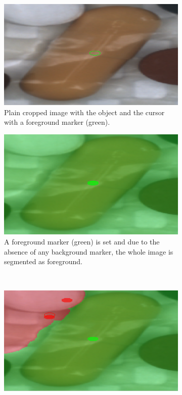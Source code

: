\begin{figure}
	\centering
	\begin{subfigure}[t]{0.45\textwidth}
		\centering
		\includegraphics[width=\textwidth]{figures/chap32_watershed_application1.png}
		\caption{
			Plain cropped image with the object and the cursor with a foreground marker (green).\\
		} \label{fig:ch3:sec3:application1}
	\end{subfigure}
	\hfill
	\begin{subfigure}[t]{0.45\textwidth}
		\centering
		\includegraphics[width=\textwidth]{figures/chap32_watershed_application2.png}
		\caption{
			A foreground marker (green) is set and due to the absence of any background marker, the whole image is segmented as foreground.
		} \label{fig:ch3:sec3:application2}
	\end{subfigure}
	\\
	\begin{subfigure}[t]{0.45\textwidth}
		\centering
		\includegraphics[width=\textwidth]{figures/chap32_watershed_application3.png}

\end{subfigure}
\end{figure}
